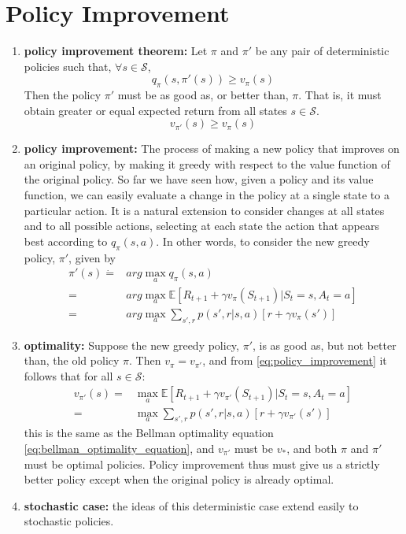 \section{Policy Improvement}
\begin{enumerate}
	\item \textbf{policy improvement theorem:} Let $\pi$ and $\pi'$ be any pair of deterministic policies such that, $\forall s \in \mathcal{S}$,
	\begin{equation}
		q_{\pi}(s, \pi'(s)) \geq v_{\pi}(s)
	\end{equation}
	Then the policy $\pi'$ must be as good as, or better than, $\pi$. That is, it must obtain greater or equal expected return from all states $s \in \mathcal{S}$.
	\begin{equation}
		v_{\pi'}(s) \geq v_{\pi}(s)
	\end{equation}

	\item \textbf{policy improvement:} The process of making a new policy that improves on an original policy, by making it greedy with respect to the value function of the original policy. So far we have seen how, given a policy and its value function, we can easily evaluate a change in the policy at a single state to a particular action. It is a natural extension to consider changes at all states and to all possible actions, selecting at each state the action that appears best according to $q_{\pi}(s,a)$. In other words, to consider the new greedy policy, $\pi'$, given by
	\begin{equation}
	\label{eq:policy_improvement}
	\begin{split}
		\pi'(s) \dot{=} & arg \max_{a}q_{\pi}(s,a)\\
			= & arg \max_{a} \mathbb{E}[R_{t+1}+\gamma v_{\pi}(S_{t+1})|S_t=s, A_t=a]\\
			= & arg \max_{a} \sum_{s', r}p(s',r|s,a)[r+\gamma v_{\pi}(s')]
	\end{split}
	\end{equation}

	\item \textbf{optimality:} Suppose the new greedy policy, $\pi'$, is as good as, but not better than, the old policy $\pi$. Then $v_{\pi}=v_{\pi'}$, and from \ref{eq:policy_improvement} it follows that for all $s \in \mathcal{S}$:
	\begin{equation}
	\begin{split}
		v_{\pi'}(s) = & \max_{a} \mathbb{E}[R_{t+1}+ \gamma v_{\pi'}(S_{t+1})|S_t=s, A_t=a]\\
			= & \max_{a} \sum_{s', r}p(s',r|s, a)[r+\gamma v_{\pi'}(s')]
	\end{split}
	\end{equation}
	this is the same as the Bellman optimality equation \ref{eq:bellman_optimality_equation}, and $v_{\pi'}$ must be $v_{*}$, and both $\pi$ and $\pi'$ must be optimal policies. Policy improvement thus must give us a strictly better policy except when the original policy is already optimal.

	\item \textbf{stochastic case:} the ideas of this deterministic case extend easily to stochastic policies.
\end{enumerate}

